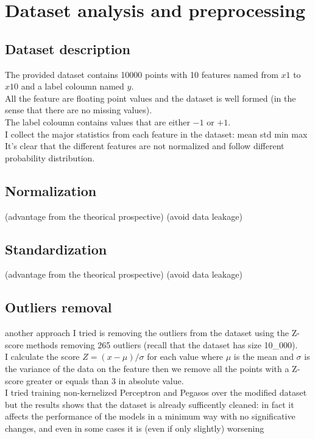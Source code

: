 \newpage
\section{Dataset analysis and preprocessing}
\subsection{Dataset description}
The provided dataset contains 10000 points with 10 features named from $x1$ to $x10$ and a label coloumn named $y$.\\
All the feature are floating point values and the dataset is well formed (in the sense that there are no missing values).\\
The label coloumn contains values that are either $-1$ or $+1$.\\
I collect the major statistics from each feature in the dataset: mean std min max
It's clear that the different features are not normalized and follow different probability distribution.

\subsection{Normalization}
(advantage from the theorical prospective) (avoid data leakage)

\subsection{Standardization}
(advantage from the theorical prospective) (avoid data leakage)

\subsection{Outliers removal}
another approach I tried is removing the outliers from the dataset using the Z-score methods removing 265 outliers (recall that the dataset has size 10_000).\\
I calculate the score $ Z = (x - \mu) / \sigma$ for each value where $\mu$ is the mean and $\sigma$ is the variance of the data on the feature then we remove all the points with a Z-score greater or equals than $3$ in absolute value.\\
I tried training non-kernelized Perceptron and Pegasos over the modified dataset but the results shows that the dataset is already sufficently cleaned: in fact it  
affects the performance of the models in a minimum way with no significative changes, and even in some cases it is (even if only slightly) worsening\\

